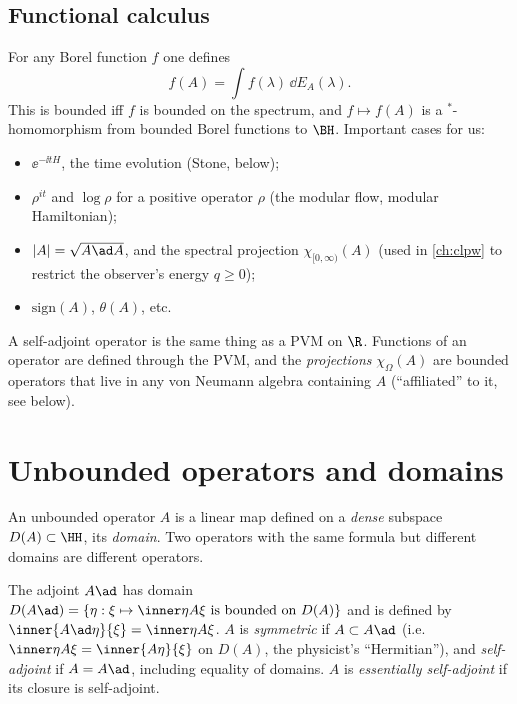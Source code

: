 \subsection*{Functional calculus}
For any Borel function $f$ one defines
\begin{equation}
f(A)=\int f(\lambda)\,\dd E_A(\lambda).
\end{equation}
This is bounded iff $f$ is bounded on the spectrum, and $f\mapsto f(A)$ is a $^*$-homomorphism from bounded Borel functions to $\BH$. Important cases for us:
\begin{itemize}
\item $\ee^{-\ii tH}$, the time evolution (Stone, below);
\item $\rho^{it}$ and $\log\rho$ for a positive operator $\rho$ (the modular flow, modular Hamiltonian);
\item $|A|=\sqrt{A\ad A}$, and the spectral projection $\chi_{[0,\infty)}(A)$ (used in \cref{ch:clpw} to restrict the observer's energy $q\ge0$);
\item $\mathrm{sign}(A)$, $\theta(A)$, etc.
\end{itemize}

\begin{keyidea}
A self-adjoint operator is the same thing as a PVM on $\R$. Functions of an operator are defined through the PVM, and the \emph{projections} $\chi_\Omega(A)$ are bounded operators that live in any von Neumann algebra containing $A$ (``affiliated'' to it, see below).
\end{keyidea}

\section{Unbounded operators and domains}

An unbounded operator $A$ is a linear map defined on a \emph{dense} subspace $D(A)\subset\HH$, its \emph{domain}. Two operators with the same formula but different domains are different operators.

\begin{definition}
The adjoint $A\ad$ has domain $D(A\ad)=\{\eta:\xi\mapsto\inner\eta{A\xi}\text{ is bounded on }D(A)\}$ and is defined by $\inner{A\ad\eta}{\xi}=\inner\eta{A\xi}$. $A$ is \emph{symmetric} if $A\subset A\ad$ (i.e.\ $\inner\eta{A\xi}=\inner{A\eta}{\xi}$ on $D(A)$, the physicist's ``Hermitian''), and \emph{self-adjoint} if $A=A\ad$, including equality of domains. $A$ is \emph{essentially self-adjoint} if its closure is self-adjoint.
\end{definition}

